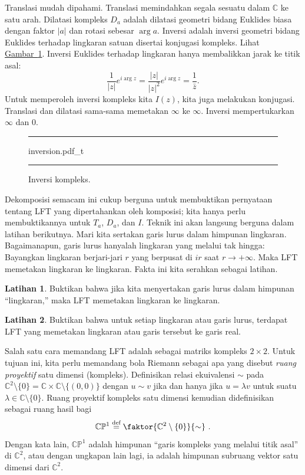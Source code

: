\documentclass[12pt,openany]{book}
\newcommand{\sabs}[1]{\lvert {#1} \rvert}
\newcommand{\C}{{\mathbb{C}}}
\newcommand{\bP}{{\mathbb{P}}}
\newcommand{\myindex}[1]{#1\index{#1}}
\newcommand{\myquote}[1]{``#1''}
\theoremstyle{plain}
\theoremstyle{remark}
\theoremstyle{definition}
\newenvironment{exbox}{%
    \def\FrameCommand{\vrule width 1pt \relax\hspace{10pt}}%
    \MakeFramed{\advance\hsize-\width\FrameRestore}%
}{%
    \endMakeFramed
}
\newenvironment{myfig}{%
\begin{figure}[h!t]
\noindent\rule{\textwidth}{0.5pt}\vspace{12pt}\par\centering}%
{\par\noindent\rule{\textwidth}{0.5pt}
\end{figure}}
\theoremstyle{exercise}
\newtheorem{exercise}{Latihan}[section]
\theoremstyle{example}
\newcommand{\figureref}[1]{\hyperref[#1]{Gambar~\ref*{#1}}}
\begin{document}
Translasi mudah dipahami.
Translasi memindahkan segala sesuatu dalam $\C$ ke satu arah.
Dilatasi
kompleks $D_a$ adalah dilatasi geometri bidang Euklides biasa dengan faktor $\sabs{a}$
dan rotasi sebesar $\arg a$.
Inversi adalah inversi geometri bidang Euklides
terhadap lingkaran satuan
disertai konjugasi kompleks.  Lihat \figureref{fig:inversion}.  Inversi Euklides
terhadap lingkaran hanya membalikkan jarak ke titik asal:
\begin{equation*}
\frac{1}{\sabs{z}} e^{i \arg z} = 
\frac{\sabs{z}}{\sabs{z}^2} e^{i \arg z} = \frac{1}{\bar{z}} .
\end{equation*}
Untuk memperoleh inversi kompleks kita $I(z)$, kita juga melakukan konjugasi.
Translasi dan dilatasi sama-sama memetakan $\infty$ ke $\infty$.
Inversi mempertukarkan $\infty$ dan $0$.

\begin{myfig}
{inversion.pdf_t}
\caption{Inversi kompleks.\label{fig:inversion}}
\end{myfig}

Dekomposisi semacam ini cukup berguna untuk membuktikan pernyataan tentang
LFT yang dipertahankan oleh komposisi;
kita hanya perlu membuktikannya untuk $T_a$, $D_a$, dan $I$.  Teknik ini
akan langsung berguna dalam latihan berikutnya.
Mari kita sertakan garis lurus dalam himpunan lingkaran.  Bagaimanapun, garis
lurus hanyalah lingkaran yang melalui tak hingga: Bayangkan lingkaran berjari-jari $r$
yang berpusat di $ir$ saat $r \to +\infty$.  Maka LFT memetakan lingkaran ke lingkaran.
Fakta ini kita serahkan sebagai latihan.

\begin{exbox}
\begin{exercise}
Buktikan bahwa jika kita menyertakan garis lurus dalam himpunan \myquote{lingkaran,} maka
LFT memetakan lingkaran ke lingkaran.
\end{exercise}

\begin{exercise} \label{exercise:anycircletorealline}
Buktikan bahwa untuk setiap lingkaran atau garis lurus, terdapat LFT
yang memetakan lingkaran atau garis tersebut ke garis real.
\end{exercise}
\end{exbox}

Salah satu cara memandang LFT adalah sebagai matriks kompleks $2 \times 2$.  Untuk tujuan
ini,
kita perlu memandang bola Riemann sebagai apa yang disebut
\emph{\myindex{ruang proyektif}} satu dimensi (kompleks).
Definisikan relasi ekuivalensi $\sim$ pada
$\C^2 \setminus \{ 0 \} = \C \times \C \setminus \{ (0,0) \}$ dengan
$u \sim v$ jika dan hanya jika $u = \lambda v$ untuk suatu $\lambda \in \C \setminus
\{ 0 \}$.
Ruang proyektif kompleks satu dimensi
kemudian didefinisikan sebagai ruang hasil bagi
%
\begin{equation*}
\C \bP^1
\overset{\text{def}}{=}
\faktor{\C^2 \setminus \{ 0\}}{\sim} \ .
\end{equation*}
Dengan kata lain, $\C \bP^1$ adalah himpunan \myquote{garis kompleks yang melalui
titik asal} di $\C^2$, atau dengan ungkapan lain lagi,
ia adalah himpunan subruang vektor satu dimensi
dari $\C^2$.
\end{document}
